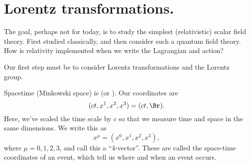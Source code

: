 %
%
\section{Lorentz transformations.}

The goal, perhaps not for today, is to study the simplest (relativistic) scalar field theory.  First studied classically, and then consider such a quantum field theory.
How is relativity implemented when we write the Lagrangian and action?

Our first step must be to consider Lorentz transformations and the Lorentz group.

Spacetime (Minkowski space) is  (or ).  Our coordinates are
\begin{equation}\label{eqn:qftLecture2:340}
(c t, x^1, x^2, x^3) = (c t, \Br).
\end{equation}
Here, we've scaled the time scale by \( c \) so that we measure time and space in the same dimensions.  We write this as
\begin{equation}\label{eqn:qftLecture2:360}
x^\mu = (x^0, x^1, x^2, x^3),
\end{equation}
%
where \( \mu = 0, 1, 2, 3 \), and call this a ``4-vector''.  These are called the space-time coordinates of an event, which tell us where and when an event occurs.

